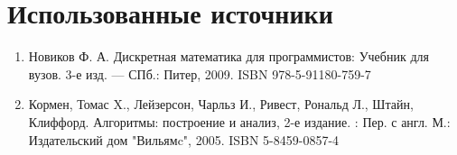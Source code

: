\documentclass[a4paper,12pt]{article} %
\begin{document}
    \newpage
    \section{Использованные источники}
    \begin{enumerate}
        \item
        Новиков Ф. А. Дискретная математика для программистов: Учебник для вузов. 3-е изд. —
        СПб.: Питер, 2009. ISBN 978-5-91180-759-7
        \item
        Кормен, Томас X., Лейзерсон, Чарльз И., Ривест, Рональд Л., Штайн, Клиффорд. Алгоритмы: построение
        и анализ, 2-е издание. : Пер. с англ. М.: Издательский дом "Вильямc", 2005. ISBN 5-8459-0857-4
    \end{enumerate}
\end{document}
